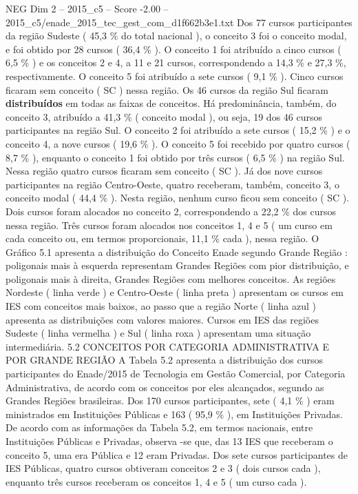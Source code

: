 \begin{textsample}{NEG Dim 2 – 2015\_c5 – Score -2.00 – 2015\_c5/enade\_2015\_tec\_gest\_com\_d1f662b3e1.txt}
Dos 77 cursos participantes da região Sudeste ( 45,3 \% do total nacional ), o conceito 3 foi o conceito modal, e foi obtido por 28 cursos ( 36,4 \% ).
O conceito 1 foi atribuído a cinco cursos ( 6,5 \% ) e os conceitos 2 e 4, a 11 e 21 cursos, correspondendo a 14,3 \% e 27,3 \%, respectivamente.
O conceito 5 foi atribuído a sete cursos ( 9,1 \% ).
Cinco cursos ficaram sem conceito ( SC ) nessa região.
Os 46 cursos da região Sul ficaram \textbf{distribuídos} em todas as faixas de conceitos.
Há predominância, também, do conceito 3, atribuído a 41,3 \% ( conceito modal ), ou seja, 19 dos 46 cursos participantes na região Sul.
O conceito 2 foi atribuído a sete cursos ( 15,2 \% ) e o conceito 4, a nove cursos ( 19,6 \% ).
O conceito 5 foi recebido por quatro cursos ( 8,7 \% ), enquanto o conceito 1 foi obtido por três cursos ( 6,5 \% ) na região Sul.
Nessa região quatro cursos ficaram sem conceito ( SC ).
Já dos nove cursos participantes na região Centro-Oeste, quatro receberam, também, conceito 3, o conceito modal ( 44,4 \% ).
Nesta região, nenhum curso ficou sem conceito ( SC ).
Dois cursos foram alocados no conceito 2, correspondendo a 22,2 \% dos cursos nessa região.
Três cursos foram alocados nos conceitos 1, 4 e 5 ( um curso em cada conceito ou, em termos proporcionais, 11,1 \% cada ), nessa região.
O Gráfico 5.1 apresenta a distribuição do Conceito Enade segundo Grande Região : poligonais mais à esquerda representam Grandes Regiões com pior distribuição, e poligonais mais à direita, Grandes Regiões com melhores conceitos.
As regiões Nordeste ( linha verde ) e Centro-Oeste ( linha preta ) apresentam os cursos em IES com conceitos mais baixos, ao passo que a região Norte ( linha azul ) apresenta as distribuições com valores maiores.
Cursos em IES das regiões Sudeste ( linha vermelha ) e Sul ( linha roxa ) apresentam uma situação intermediária. 5.2 CONCEITOS POR CATEGORIA ADMINISTRATIVA E POR GRANDE REGIÃO A Tabela 5.2 apresenta a distribuição dos cursos participantes do Enade/2015 de Tecnologia em Gestão Comercial, por Categoria Administrativa, de acordo com os conceitos por eles alcançados, segundo as Grandes Regiões brasileiras.
Dos 170 cursos participantes, sete ( 4,1 \% ) eram ministrados em Instituições Públicas e 163 ( 95,9 \% ), em Instituições Privadas.
De acordo com as informações da Tabela 5.2, em termos nacionais, entre Instituições Públicas e Privadas, observa -se que, das 13 IES que receberam o conceito 5, uma era Pública e 12 eram Privadas.
Dos sete cursos participantes de IES Públicas, quatro cursos obtiveram conceitos 2 e 3 ( dois cursos cada ), enquanto três cursos receberam os conceitos 1, 4 e 5 ( um curso cada ).

\end{textsample}
